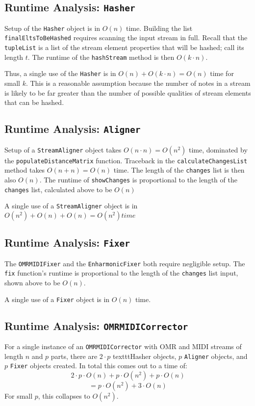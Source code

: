 \subsection{Runtime Analysis: \texttt{Hasher}}
Setup of the \texttt{Hasher} object is in $O(n)$ time. Building the list \texttt{finalEltsToBeHashed} requires scanning the input stream in full. Recall that the \texttt{tupleList} is a list of the stream element properties that will be hashed; call its length $t$. The runtime of the \texttt{hashStream} method is then $O(k \cdot n)$. 

Thus, a single use of the \texttt{Hasher} is in $O(n) + O(k \cdot n) = O(n)$ time for small $k$. This is a reasonable assumption because the number of notes in a stream is likely to be far greater than the number of possible qualities of stream elements that can be hashed. 

\subsection{Runtime Analysis: \texttt{Aligner}}
Setup of a \texttt{StreamAligner} object takes $O(n \cdot n) = O(n^2)$ time, dominated by the \texttt{populateDistanceMatrix} function. Traceback in the \texttt{calculateChangesList} method takes $O(n+ n) = O(n)$ time. The length of the \texttt{changes} list is then also $O(n)$. The runtime of \texttt{showChanges} is proportional to the length of the \texttt{changes} list, calculated above to be $O(n)$

A single use of a \texttt{StreamAligner} object is in $O(n^2) + O(n) +O(n) = O(n^2) time$ 

\subsection{Runtime Analysis: \texttt{Fixer}}
The \texttt{OMRMIDIFixer} and the \texttt{EnharmonicFixer} both require negligible setup. The \texttt{fix} function's runtime is proportional to the length of the \texttt{changes} list input, shown above to be $O(n)$. 

A single use of a \texttt{Fixer} object is in $O(n)$ time. 

\subsection{Runtime Analysis: \texttt{OMRMIDICorrector}}
For a single instance of an \texttt{OMRMIDICorrector} with OMR and MIDI streams of length $n$ and $p$ parts, there are $2 \cdot p$ texttt{Hasher} objects, $p$ \texttt{Aligner} objects, and $p$ \texttt{Fixer} objects created. In total this comes out to a time of:
$$2 \cdot p \cdot O(n) + p \cdot O(n^2) + p \cdot O(n)$$
$$ = p \cdot O(n^2) + 3 \cdot O(n)$$ For small $p$, this collapses to $O(n^2)$. 
 
